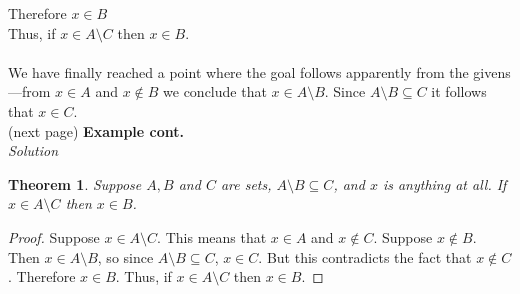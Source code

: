 \documentclass{report}
\newtheorem*{theorem}{Theorem}
\begin{document}
\indent\indent Therefore $x\in B$\\
\indent Thus, if $x\in A\setminus C$ then $x\in B$.\\
\vspace{1mm}\\
We have finally reached a point where the goal follows apparently from the givens---from $x\in A$ and $x\notin B$ we conclude that $x\in A\setminus B$. Since $A\setminus B\subseteq C$ it
follows that $x\in C$.\\
(next page)\newpage
\noindent\textbf{Example cont.}\\
\textit{Solution}
\begin{theorem}
Suppose $A,B$ and $C$ are sets, $A\setminus B\subseteq C$, and $x$ is anything at all. If $x\in A\setminus C$ then $x\in B$.
\end{theorem}
\begin{proof}
Suppose $x\in A\setminus C$. This means that $x\in A$ and $x\notin C$. Suppose $x\notin B$. Then
$x\in A\setminus B$, so since $A\setminus B\subseteq C$, $x\in C$. But this contradicts the fact that $x\notin C$. Therefore $x\in B$. Thus, if $x\in A\setminus C$ then $x\in B$.
\end{proof}
\end{document}
